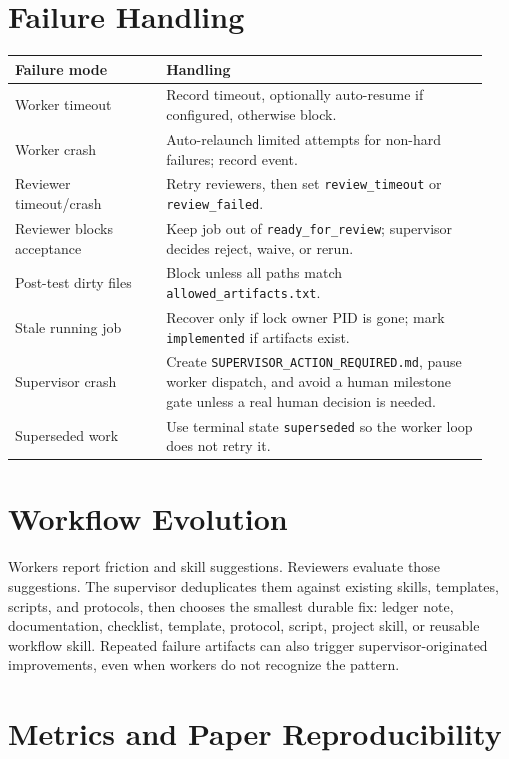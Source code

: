 \documentclass[11pt]{article}
\renewcommand{\path}[1]{\texttt{#1}}
\begin{document}
\section{Failure Handling}

\begin{longtable}{p{0.30\linewidth}p{0.64\linewidth}}
\textbf{Failure mode} & \textbf{Handling}\\
\hline
Worker timeout & Record timeout, optionally auto-resume if configured, otherwise block.\\
Worker crash & Auto-relaunch limited attempts for non-hard failures; record event.\\
Reviewer timeout/crash & Retry reviewers, then set \path{review\_timeout} or \path{review\_failed}.\\
Reviewer blocks acceptance & Keep job out of \path{ready\_for\_review}; supervisor decides reject, waive, or rerun.\\
Post-test dirty files & Block unless all paths match \path{allowed\_artifacts.txt}.\\
Stale running job & Recover only if lock owner PID is gone; mark \path{implemented} if artifacts exist.\\
Supervisor crash & Create \path{SUPERVISOR\_ACTION\_REQUIRED.md}, pause worker dispatch, and avoid a human milestone gate unless a real human decision is needed.\\
Superseded work & Use terminal state \path{superseded} so the worker loop does not retry it.\\
\end{longtable}

\section{Workflow Evolution}

Workers report friction and skill suggestions.  Reviewers evaluate those
suggestions.  The supervisor deduplicates them against existing skills,
templates, scripts, and protocols, then chooses the smallest durable fix:
ledger note, documentation, checklist, template, protocol, script, project skill,
or reusable workflow skill.  Repeated failure artifacts can also trigger
supervisor-originated improvements, even when workers do not recognize the
pattern.

\section{Metrics and Paper Reproducibility}
\end{document}
